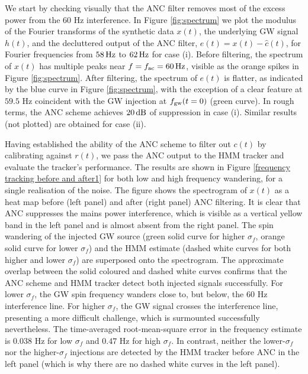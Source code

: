 \documentclass[pra,superscriptaddress,reprint,amsmath,amssymb,nofootinbib]{revtex4-2}
\begin{document}
We start by checking visually that the ANC filter removes most of the excess power from the 60 Hz interference. In Figure \ref{fig:spectrum} we plot the modulus of the Fourier transforms of the synthetic data $x(t)$, the underlying GW signal $h(t)$, and the decluttered output of the ANC filter, $e(t) = x(t) - \hat{c}(t)$, for Fourier frequencies from $58 \, {\rm Hz}$ to $62 \, {\rm Hz}$ for case (i). Before filtering, the spectrum of $x(t)$ has multiple peaks near $f = f_{\rm ac} = 60 \, {\rm Hz}$, visible as the orange spikes in Figure \ref{fig:spectrum}. After filtering, the spectrum of $e(t)$ is flatter, as indicated by the blue curve in Figure \ref{fig:spectrum}, with the exception of a clear feature at $59.5$ Hz coincident with the GW injection at $f_{\rm gw}(t=0)$ (green curve). In rough terms, the ANC scheme achieves $20 \, {\rm dB}$ of suppression in case (i). Similar results (not plotted) are obtained for case (ii). \newline 
 
Having established the ability of the ANC scheme to filter out $c(t)$ by calibrating against $r(t)$, we pass the ANC output to the HMM tracker and evaluate the tracker's performance. The results are shown in  Figure \ref{frequency tracking before and after1} for both low and high frequency wandering, for a single realisation of the noise. The figure shows the spectrogram of $x(t)$ as a heat map before (left panel) and after (right panel) ANC filtering. It is clear that ANC suppresses the mains power interference, which is visible as a vertical yellow band in the left panel and is almost absent from the right panel. The spin wandering of the injected GW source (green solid curve for higher $\sigma_f$, orange solid curve for lower $\sigma_f$) and the HMM estimate (dashed white curves for both higher and lower $\sigma_f$) are superposed onto the spectrogram. The approximate overlap between the solid coloured and dashed white curves confirms that the ANC scheme and HMM tracker detect both injected signals successfully. For lower $\sigma_f$, the GW spin frequency wanders close to, but below, the 60 Hz interference line. For higher $\sigma_f$, the GW signal crosses the interference line, presenting a more difficult challenge, which is surmounted successfully nevertheless. The time-averaged root-mean-square error in the frequency estimate is $0.038$ Hz for low $\sigma_f $ and $0.47$ Hz for high $\sigma_f$. In contrast, neither the lower-$\sigma_f$ nor the higher-$\sigma_f$ injections are detected by the HMM tracker before ANC in the left panel (which is why there are no dashed white curves in the left panel). 
\end{document}
